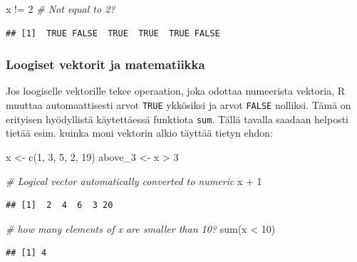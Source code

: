 \documentclass[
]{book}
\newenvironment{Shaded}{\begin{snugshade}}{\end{snugshade}}
\newcommand{\CommentTok}[1]{\textcolor[rgb]{0.56,0.35,0.01}{\textit{#1}}}
\newcommand{\DecValTok}[1]{\textcolor[rgb]{0.00,0.00,0.81}{#1}}
\newcommand{\FunctionTok}[1]{\textcolor[rgb]{0.00,0.00,0.00}{#1}}
\newcommand{\NormalTok}[1]{#1}
\newcommand{\OtherTok}[1]{\textcolor[rgb]{0.56,0.35,0.01}{#1}}
\newcommand{\SpecialCharTok}[1]{\textcolor[rgb]{0.00,0.00,0.00}{#1}}
\begin{document}
\begin{Shaded}
\begin{Highlighting}[]
\NormalTok{x }\SpecialCharTok{!=} \DecValTok{2} \CommentTok{\# Not equal to 2?}
\end{Highlighting}
\end{Shaded}

\begin{verbatim}
## [1]  TRUE FALSE  TRUE  TRUE  TRUE FALSE
\end{verbatim}

\hypertarget{loogiset-vektorit-ja-matematiikka}{%
\subsubsection{Loogiset vektorit ja matematiikka}\label{loogiset-vektorit-ja-matematiikka}}

Jos loogiselle vektorille tekee operaation, joka odottaa numeerista vektoria, R muuttaa automaattisesti arvot \texttt{TRUE} ykkösiksi ja arvot \texttt{FALSE} nolliksi. Tämä on erityisen hyödyllistä käytettäessä funktiota \texttt{sum}. Tällä tavalla saadaan helposti tietää esim. kuinka moni vektorin alkio täyttää tietyn ehdon:

\begin{Shaded}
\begin{Highlighting}[]
\NormalTok{x }\OtherTok{\textless{}{-}} \FunctionTok{c}\NormalTok{(}\DecValTok{1}\NormalTok{, }\DecValTok{3}\NormalTok{, }\DecValTok{5}\NormalTok{, }\DecValTok{2}\NormalTok{, }\DecValTok{19}\NormalTok{)}
\NormalTok{above\_3 }\OtherTok{\textless{}{-}}\NormalTok{ x }\SpecialCharTok{\textgreater{}} \DecValTok{3}

\CommentTok{\# Logical vector automatically converted to numeric}
\NormalTok{x }\SpecialCharTok{+} \DecValTok{1}
\end{Highlighting}
\end{Shaded}

\begin{verbatim}
## [1]  2  4  6  3 20
\end{verbatim}

\begin{Shaded}
\begin{Highlighting}[]
\CommentTok{\# how many elements of x are smaller than 10?}
\FunctionTok{sum}\NormalTok{(x }\SpecialCharTok{\textless{}} \DecValTok{10}\NormalTok{)}
\end{Highlighting}
\end{Shaded}

\begin{verbatim}
## [1] 4
\end{verbatim}
\end{document}
